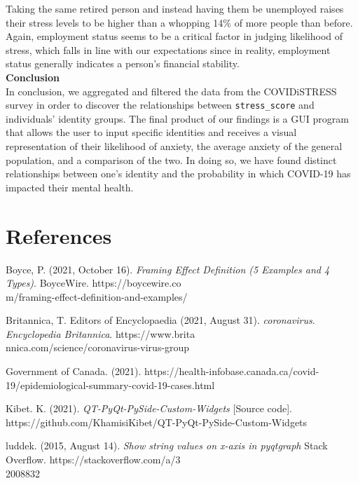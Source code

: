 \documentclass[fontsize=11pt]{article}
\begin{document}
    Taking the same retired person and instead having them be unemployed raises their stress levels to be higher than a whopping 14\% of more people than before. Again, employment status seems to be a critical factor in judging likelihood of stress, which falls in line with our expectations since in reality, employment status generally indicates a person’s financial stability. \\
    
    \textbf{Conclusion} \\
    In conclusion, we aggregated and filtered the data from the COVIDiSTRESS survey in order to discover the relationships between \texttt{stress\_score} and individuals’ identity groups. The final product of our findings is a GUI program that allows the user to input specific identities and receives a visual representation of their likelihood of anxiety, the average anxiety of the general population, and a comparison of the two. In doing so, we have found distinct relationships between one’s identity and the probability in which COVID-19 has impacted their mental health.

    \section*{References}

    \hangindent=0.7cm \noindent
    Boyce, P. (2021, October 16). \textit{Framing Effect Definition (5 Examples and 4 Types)}. BoyceWire.
    https://boycewire.co\\m/framing-effect-definition-and-examples/

    \hangindent=0.7cm \noindent
    Britannica, T. Editors of Encyclopaedia (2021, August 31). \textit{coronavirus}. \textit{Encyclopedia Britannica}.
    https://www.brita\\nnica.com/science/coronavirus-virus-group

    \hangindent=0.7cm \noindent
    Government of Canada. (2021).
    https://health-infobase.canada.ca/covid-19/epidemiological-summary-covid-19-cases.html

    \hangindent=0.7cm \noindent
    Kibet. K. (2021). \textit{QT-PyQt-PySide-Custom-Widgets} [Source code].
    https://github.com/KhamisiKibet/QT-PyQt-PySide-Custom-Widgets

    \hangindent=0.7cm \noindent
    luddek. (2015, August 14). \textit{Show string values on x-axis in pyqtgraph} Stack Overflow.
    https://stackoverflow.com/a/3\\2008832
\end{document}
